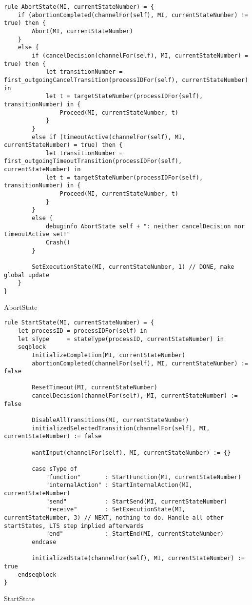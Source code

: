 \begin{listing}[H]
\begin{verbatim}
rule AbortState(MI, currentStateNumber) = {
    if (abortionCompleted(channelFor(self), MI, currentStateNumber) != true) then {
        Abort(MI, currentStateNumber)
    }
    else {
        if (cancelDecision(channelFor(self), MI, currentStateNumber) = true) then {
            let transitionNumber = first_outgoingCancelTransition(processIDFor(self), currentStateNumber) in
            let t = targetStateNumber(processIDFor(self), transitionNumber) in {
                Proceed(MI, currentStateNumber, t)
            }
        }
        else if (timeoutActive(channelFor(self), MI, currentStateNumber) = true) then {
            let transitionNumber = first_outgoingTimeoutTransition(processIDFor(self), currentStateNumber) in
            let t = targetStateNumber(processIDFor(self), transitionNumber) in {
                Proceed(MI, currentStateNumber, t)
            }
        }
        else {
            debuginfo AbortState self + ": neither cancelDecision nor timeoutActive set!"
            Crash()
        }

        SetExecutionState(MI, currentStateNumber, 1) // DONE, make global update
    }
}
\end{verbatim}
\caption{AbortState}
\label{lst:asm:AbortState}
\end{listing}




\begin{listing}[H]
\begin{verbatim}
rule StartState(MI, currentStateNumber) = {
    let processID = processIDFor(self) in
    let sType     = stateType(processID, currentStateNumber) in
    seqblock
        InitializeCompletion(MI, currentStateNumber)
        abortionCompleted(channelFor(self), MI, currentStateNumber) := false

        ResetTimeout(MI, currentStateNumber)
        cancelDecision(channelFor(self), MI, currentStateNumber) := false

        DisableAllTransitions(MI, currentStateNumber)
        initializedSelectedTransition(channelFor(self), MI, currentStateNumber) := false

        wantInput(channelFor(self), MI, currentStateNumber) := {}

        case sType of
            "function"       : StartFunction(MI, currentStateNumber)
            "internalAction" : StartInternalAction(MI, currentStateNumber)
            "send"           : StartSend(MI, currentStateNumber)
            "receive"        : SetExecutionState(MI, currentStateNumber, 3) // NEXT, nothing to do. Handle all other startStates, LTS step implied afterwards
            "end"            : StartEnd(MI, currentStateNumber)
        endcase

        initializedState(channelFor(self), MI, currentStateNumber) := true
    endseqblock
}
\end{verbatim}
\caption{StartState}
\label{lst:asm:StartState}
\end{listing}




